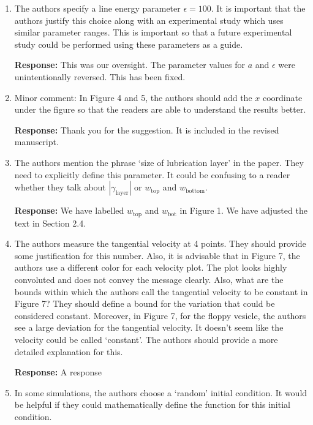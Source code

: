 \documentclass[11pt]{article}
\begin{document}
\begin{enumerate}
\item The authors specify a line energy parameter $\epsilon = 100$. It
  is important that the authors justify this choice along with an
    experimental study which uses similar parameter ranges. This is
    important so that a future experimental study could be performed
    using these parameters as a guide.

\noindent
{\bf Response:} This was our oversight. The parameter values for $a$ and
$\epsilon$ were unintentionally reversed. This has been fixed.

\item Minor comment: In Figure 4 and 5, the authors should add the $x$
  coordinate under the figure so that the readers are able to understand
    the results better.

\noindent
{\bf Response:} Thank you for the suggestion. It is included in the
    revised manuscript.

\item The authors mention the phrase `size of lubrication layer' in the
  paper. They need to explicitly define this parameter. It could be
    confusing to a reader whether they talk about
    $|\gamma_{\mathrm{layer}}|$ or $w_{\mathrm{top}}$ and
    $w_{\mathrm{bottom}}$.

\noindent
    {\bf Response:} We have labelled $w_{\mathrm{top}}$ and
    $w_{\mathrm{bot}}$ in Figure 1. We have adjusted the text in Section
    2.4.

\item The authors measure the tangential velocity at 4 points. They
  should provide some justification for this number. Also, it is
    advisable that in Figure 7, the authors use a different color for
    each velocity plot. The plot looks highly convoluted and does not
    convey the message clearly. Also, what are the bounds within which
    the authors call the tangential velocity to be constant in Figure 7?
    They should define a bound for the variation that could be
    considered constant. Moreover, in Figure 7, for the floppy vesicle,
    the authors see a large deviation for the tangential velocity. It
    doesn't seem like the velocity could be called `constant'. The
    authors should provide a more detailed explanation for this.

\noindent
{\bf Response:} A response

\item In some simulations, the authors choose a `random' initial
  condition. It would be helpful if they could mathematically define the
    function for this initial condition.


\end{enumerate}
\end{document}
